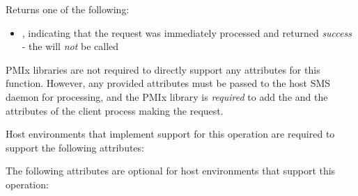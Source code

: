 \begin{arglist}
\end{arglist}

Returns one of the following:

\returnsimplenb

\returnstart
\begin{itemize}
    \item {}, indicating that the request was immediately processed and returned \textit{success} - the  will \textit{not} be called
\end{itemize}
\returnend

\reqattrstart
\ac{PMIx} libraries are not required to directly support any attributes for this function. However, any provided attributes must be passed to the host \ac{SMS} daemon for processing, and the \ac{PMIx} library is \textit{required} to add the  and the  attributes of the client process making the request.

Host environments that implement support for this operation are required to support the following attributes:


\reqattrend

\optattrstart
The following attributes are optional for host environments that support this operation:


